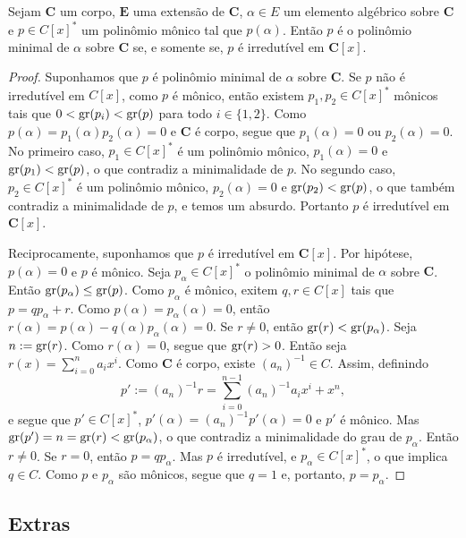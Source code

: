 \begin{proposition}
	Sejam $\bm C$ um corpo, $\bm E$ uma extensão de $\bm C$, $\alpha \in E$ um elemento algébrico sobre $\bm C$ e $p \in C[x]^*$ um polinômio mônico tal que $p(\alpha)$. Então $p$ é o polinômio minimal de $\alpha$ sobre $\bm C$ se, e somente se, $p$ é irredutível em $\bm C[x]$.
\end{proposition}
\begin{proof}
	Suponhamos que $p$ é polinômio minimal de $\alpha$ sobre $\bm C$. Se $p$ não é irredutível em $C[x]$, como $p$ é mônico, então existem $p_1,p_2 \in C[x]^*$ mônicos tais que $0 < \operatorname{gr}(p_i) < \operatorname{gr}(p)$ para todo $i \in \{1,2\}$. Como $p(\alpha)=p_1(\alpha)p_2(\alpha)=0$ e $\bm C$ é corpo, segue que $p_1(\alpha)=0$ ou $p_2(\alpha)=0$. No primeiro caso, $p_1 \in C[x]^*$ é um polinômio mônico, $p_1(\alpha)=0$ e $\operatorname{gr}(p_1) < \operatorname{gr}(p)$, o que contradiz a minimalidade de $p$. No segundo caso, $p_2 \in C[x]^*$ é um polinômio mônico, $p_2(\alpha)=0$ e $\operatorname{gr}(p_2) < \operatorname{gr}(p)$, o que também contradiz a minimalidade de $p$, e temos um absurdo. Portanto $p$ é irredutível em $\bm C[x]$.

	Reciprocamente, suponhamos que $p$ é irredutível em $\bm C[x]$. Por hipótese, $p(\alpha)=0$ e $p$ é mônico. Seja $p_\alpha \in C[x]^*$ o polinômio minimal de $\alpha$ sobre $\bm C$. Então $\operatorname{gr}(p_\alpha) \leq \operatorname{gr}(p)$. Como $p_\alpha$ é mônico, exitem $q,r \in C[x]$ tais que $p = qp_\alpha+r$. Como $p(\alpha) = p_\alpha(\alpha) = 0$, então $r(\alpha) = p(\alpha) - q(\alpha)p_\alpha(\alpha) = 0$. Se $r \neq 0$, então $\operatorname{gr}(r) < \operatorname{gr}(p_\alpha)$. Seja $n := \operatorname{gr}(r)$. Como $r(\alpha)=0$, segue que $\operatorname{gr}(r)>0$. Então seja $r(x) = \sum_{i=0}^n a_ix^i$. Como $\bm C$ é corpo, existe $(a_n)^{-1} \in C$. Assim, definindo
	\begin{equation*}
	p' := (a_n)^{-1}r = \sum_{i=0}^{n-1} (a_n)^{-1}a_ix^i + x^n,
	\end{equation*}
e segue que $p' \in C[x]^*$, $p'(\alpha)=(a_n)^{-1}p'(\alpha)=0$ e $p'$ é mônico. Mas $\operatorname{gr}(p') = n = \operatorname{gr}(r) < \operatorname{gr}(p_\alpha)$, o que contradiz a minimalidade do grau de $p_\alpha$. Então $r \neq 0$. Se $r=0$, então $p=qp_\alpha$. Mas $p$ é irredutível, e $p_\alpha \in C[x]^*$, o que implica $q \in C$. Como $p$ e $p_\alpha$ são mônicos, segue que $q=1$ e, portanto, $p=p_\alpha$.
\end{proof}



\subsection{Extras}

